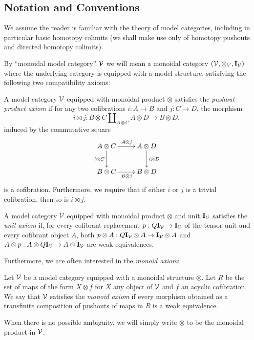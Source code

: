 \documentclass[12pt]{amsart}
\begin{document}
\subsection{Notation and Conventions}
	\noindent We assume the reader is familiar with the theory of model categories, including in particular basic homotopy colimits (we shall make use only of homotopy pushouts and directed homotopy colimits).
	\par 
	By ``monoidal model category'' $\mathcal{V}$ we will mean a monoidal category $(\mathcal{V}, \otimes_V, \mathbf{I}_\mathcal{V})$ where the underlying category is equipped with a model structure, satisfying the following two compatibility axioms:
\begin{definition}
  A model category $\mathcal{V}$ equipped with monoidal product $\otimes$ satisfies the \emph{pushout-product axiom} if for any two cofibrations $i : A \to B$ and $j : C \to D$, the morphism
    \[
      i \boxtimes j: B \otimes C \amalg_{A \otimes C} A \otimes D \to
      B \otimes D,
    \]
    induced by the commutative square
    \[
      \xymatrix{ A \otimes C \ar[d]_{i \otimes C} \ar[r]^{A \otimes j}
        &
        A \otimes D \ar[d]^{i \otimes D} \\
        B \otimes C \ar[r]_{B \otimes j} & B \otimes D }
    \]
    is a cofibration. Furthermore, we require that if either $i$ or $j$ is a trivial
    cofibration, then so is $i \boxtimes j$.
\end{definition}
\begin{definition}
	A model category $\mathcal{V}$ equipped with monoidal product $\otimes$ and unit $\mathbf{I}_\mathcal{V}$ satisfies the \emph{unit axiom}
  	if, for every cofibrant replacement $p : Q\mathbf{I}_\mathcal{V} \to \mathbf{I}_\mathcal{V}$ of the tensor unit
    and every cofibrant object $A$, both $p \otimes A : Q\mathbf{I}_\mathcal{V} \otimes A \to \mathbf{I}_\mathcal{V}
    \otimes A$ and $A \otimes p : A \otimes Q\mathbf{I}_\mathcal{V} \to A \otimes \mathbf{I}_\mathcal{V}$ are weak
    equivalences.
\end{definition}
Furthermore, we are often interested in the \textit{monoid axiom}:
\begin{definition}\label{dfn:monoid-axiom}
	Let $\mathcal{V}$ be a model category equipped with a monoidal structure $\otimes$. Let $R$ be the set of maps of the form $X \otimes f$ for $X$ any object of $\mathcal{V}$ and $f$ an acyclic cofibration.  
	We say that $\mathcal{V}$ satisfies the \emph{monoid axiom} if every morphism obtained as a transfinite composition of pushouts of maps in $R$ is a weak equivalence. 
\end{definition}
When there is no possible ambiguity, we will simply write $\otimes$ to be the monoidal product in $\mathcal{V}$. 
\end{document}
